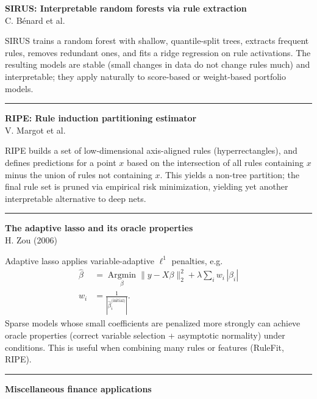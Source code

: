 \documentclass[a5paper]{article}
\def\subsection#1{{\par\bigskip\goodbreak\large\bfseries #1\par}}
\begin{document}
\textbf{SIRUS: Interpretable random forests via rule extraction}\\
C. Bénard et al.

SIRUS trains a random forest with shallow, quantile-split trees,
extracts frequent rules, removes redundant ones, and fits a ridge
regression on rule activations. The resulting models are stable (small
changes in data do not change rules much) and interpretable; they apply
naturally to score-based or weight-based portfolio models.

\begin{center}\rule{0.5\linewidth}{0.5pt}\end{center}

\textbf{RIPE: Rule induction partitioning estimator}\\
V. Margot et al.

RIPE builds a set of low-dimensional axis-aligned rules
(hyperrectangles), and defines predictions for a point $x$ based on the
intersection of all rules containing $x$ minus the union of rules not
containing $x$. This yields a non-tree partition; the final rule set is
pruned via empirical risk minimization, yielding yet another
interpretable alternative to deep nets.

\begin{center}\rule{0.5\linewidth}{0.5pt}\end{center}

\textbf{The adaptive lasso and its oracle properties}\\
H. Zou (2006)

Adaptive lasso applies variable-adaptive $\ell^1$ penalties, e.g.
\begin{align*}
  \hat\beta &= \operatorname*{Argmin}_\beta \|y - X\beta\|_2^2 +
  \lambda\sum_i w_i\,|\beta_i|
  \\
  w_i &=
  \frac{1}{|\hat\beta^{\text{(initial)}}_i|}.
\end{align*}
Sparse models whose small coefficients are penalized more strongly can
achieve oracle properties (correct variable selection + asymptotic
normality) under conditions. This is useful when combining many rules or
features (RuleFit, RIPE).

\begin{center}\rule{0.5\linewidth}{0.5pt}\end{center}

\subsection{Miscellaneous finance
applications}\label{miscellaneous-finance-applications}
\end{document}
